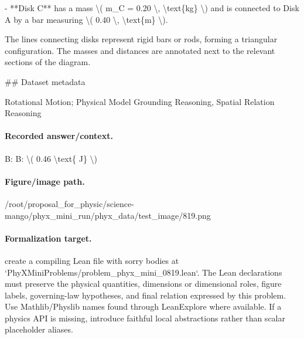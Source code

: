 - **Disk C** has a mass \textbackslash{}( m\_C = 0.20 \textbackslash{}, \textbackslash{}text\{kg\} \textbackslash{}) and is connected to Disk A by a bar measuring \textbackslash{}( 0.40 \textbackslash{}, \textbackslash{}text\{m\} \textbackslash{}).

The lines connecting disks represent rigid bars or rods, forming a triangular configuration. The masses and distances are annotated next to the relevant sections of the diagram.

\#\# Dataset metadata

Rotational Motion; Physical Model Grounding Reasoning, Spatial Relation Reasoning

\paragraph{Recorded answer/context.}
B: B: \textbackslash{}( 0.46 \textbackslash{}text\{ J\} \textbackslash{})

\paragraph{Figure/image path.}
/root/proposal\_for\_physic/science-mango/phyx\_mini\_run/phyx\_data/test\_image/819.png

\paragraph{Formalization target.}
create a compiling Lean file with sorry bodies at `PhyXMiniProblems/problem\_phyx\_mini\_0819.lean`. The Lean declarations must preserve the physical quantities, dimensions or dimensional roles, figure labels, governing-law hypotheses, and final relation expressed by this problem.
Use Mathlib/Physlib names found through LeanExplore where available. If a physics API is missing, introduce faithful local abstractions rather than scalar placeholder aliases.

